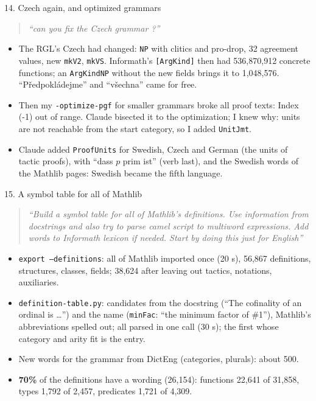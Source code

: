 \documentclass[10pt,aspectratio=169]{beamer}
\newcommand{\bad}[1]{\textcolor{warn}{#1}}
\newcommand{\ok}[1]{\textcolor{good}{#1}}
\newcommand{\prompt}[1]{\begin{quote}\small\itshape ``#1''\end{quote}}
\begin{document}
\begin{frame}{14. Czech again, and optimized grammars}
  \small
  \prompt{can you fix the Czech grammar ?}
  \begin{itemize}
    \item The RGL's Czech had changed: \texttt{NP} with clitics and pro-drop, 32 agreement
          values, new \texttt{mkV2}, \texttt{mkVS}. Informath's \texttt{[ArgKind]} then
          had 536,870,912 concrete functions; an \texttt{ArgKindNP} without the new fields
          brings it to 1,048,576. ``Předpokládejme'' and ``všechna'' came for free.
    \item Then my \texttt{-optimize-pgf} for smaller grammars broke all proof texts:
          \bad{Index (-1) out of range}. Claude bisected it to the optimization; I knew
          why: units are not reachable from the start category, so I added \texttt{UnitJmt}.
    \item Claude added \texttt{ProofUnits} for Swedish, Czech and German (the units of
          tactic proofs), with ``dass $p$ prim \ok{ist}'' (verb last), and the Swedish
          words of the Mathlib pages: Swedish became the fifth language.
  \end{itemize}
\end{frame}

\begin{frame}{15. A symbol table for all of Mathlib}
  \small
  \prompt{Build a symbol table for all of Mathlib's definitions. Use information from
  docstrings and also try to parse camel script to multiword expressions. Add words to
  Informath lexicon if needed. Start by doing this just for English}
  \begin{itemize}
    \item \texttt{export --definitions}: all of Mathlib imported once (20 s), 56,867
          definitions, structures, classes, fields; 38,624 after leaving out tactics,
          notations, auxiliaries.
    \item \texttt{definition-table.py}: candidates from the docstring (``The cofinality of
          an ordinal is \dots'') and the name (\texttt{minFac}: ``the minimum factor of
          \#1''), Mathlib's abbreviations spelled out; all parsed in one call (30 s); the
          first whose category and arity fit is the entry.
    \item New words for the grammar from DictEng (categories, plurals): about 500.
    \item \textbf{70\%} of the definitions have a wording (26,154): functions 22,641 of
          31,858, types 1,792 of 2,457, predicates 1,721 of 4,309.
  \end{itemize}
\end{frame}
\end{document}
